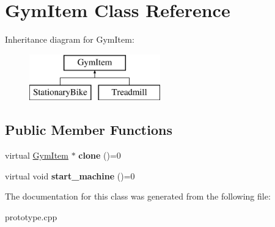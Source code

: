 \hypertarget{class_gym_item}{}\section{Gym\+Item Class Reference}
\label{class_gym_item}
Inheritance diagram for Gym\+Item\+:\begin{figure}[H]
\begin{center}
\leavevmode
\includegraphics[height=2.000000cm]{class_gym_item}
\end{center}
\end{figure}
\subsection*{Public Member Functions}
\begin{DoxyCompactItemize}
\item 
virtual \hyperlink{class_gym_item}{Gym\+Item} $\ast$ {\bfseries clone} ()=0\hypertarget{class_gym_item_a2c0c7b444e2c64288c91bfa14ac48c8e}{}\label{class_gym_item_a2c0c7b444e2c64288c91bfa14ac48c8e}

\item 
virtual void {\bfseries start\+\_\+machine} ()=0\hypertarget{class_gym_item_ad449e15b73f9aa2f1fea30ee63ad538b}{}\label{class_gym_item_ad449e15b73f9aa2f1fea30ee63ad538b}

\end{DoxyCompactItemize}


The documentation for this class was generated from the following file\+:\begin{DoxyCompactItemize}
\item 
prototype.\+cpp\end{DoxyCompactItemize}
